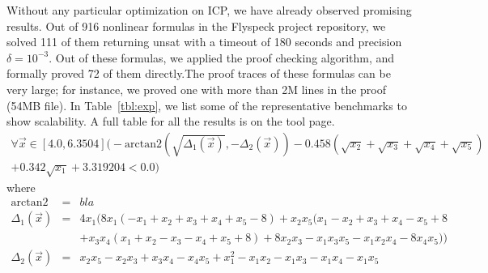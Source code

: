 Without any particular optimization on ICP, we have already observed
promising results. Out of 916 nonlinear formulas in the Flyspeck
project repository, we solved 111 of them returning {\sf unsat} with a
timeout of 180 seconds and precision $\delta=10^{-3}$. Out of these
formulas, we applied the proof checking algorithm, and formally proved
72 of them directly.The proof traces of these formulas can be very
large; for instance, we proved one with more than 2M lines in the
proof (54MB file). In Table~\ref{tbl:exp}, we list some of the
representative benchmarks to show scalability. A full table for all
the results is on the tool page. 
\begin{multline*}
\forall\vec{x} \in [4.0, 6.3504]\Big(- \mathrm{arctan2}(\sqrt{\Delta_1(\vec{x})}, - \Delta_2(\vec{x})) - 0.458(\sqrt{x_2} + \sqrt{x_3} +\sqrt{x_4} + \sqrt{x_5})\\
 + 0.342\sqrt{x_1} + 3.319204 < 0.0\Big)
\end{multline*}
where 
\begin{eqnarray*}
\mathrm{arctan2} &=& bla\\
  \Delta_1(\vec{x}) &=& 4x_1 (8x_1 (-x_1 + x_2 + x_3 + x_4 + x_5 - 8) + x_2 x_5 (x_1 - x_2 + x_3 + x_4 - x_5+8\\%
& &+ x_3x_4(x_1 + x_2 - x_3 - x_4 + x_5 + 8)+ 8 x_2 x_3 - x_1 x_3 x_5 - x_1  x_2  x_4 - 8 x_4 x_5))\\
\Delta_2(\vec{x}) &=& x_2 x_5 -x_2 x_3 + x_3x_4 - x_4 x_5 +x_1^2 -x_1x_2 - x_1x_3 - x_1x_4 -x_1 x_5 
\end{eqnarray*}
